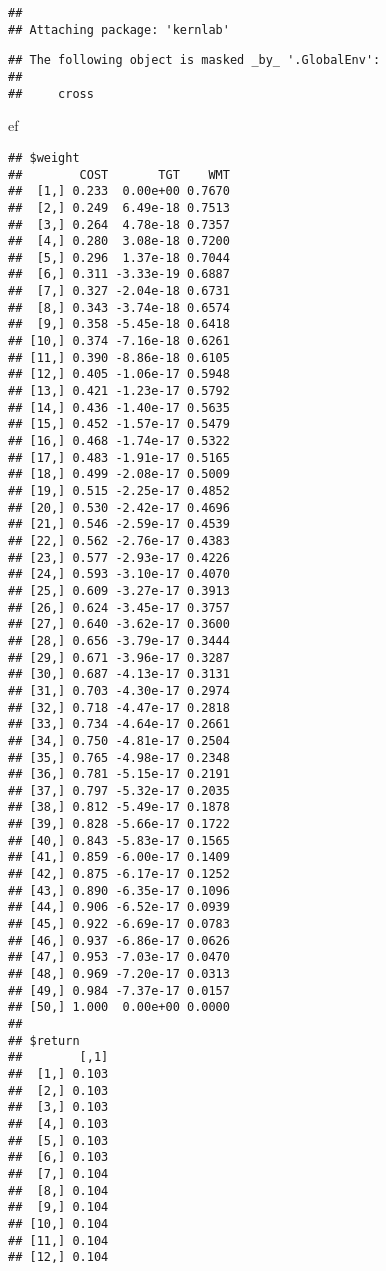 \documentclass[]{article}
\newenvironment{Shaded}{\begin{snugshade}}{\end{snugshade}}
\newcommand{\NormalTok}[1]{#1}
\begin{document}
\begin{verbatim}
## 
## Attaching package: 'kernlab'
\end{verbatim}

\begin{verbatim}
## The following object is masked _by_ '.GlobalEnv':
## 
##     cross
\end{verbatim}

\begin{Shaded}
\begin{Highlighting}[]
\NormalTok{ef}
\end{Highlighting}
\end{Shaded}

\begin{verbatim}
## $weight
##        COST       TGT    WMT
##  [1,] 0.233  0.00e+00 0.7670
##  [2,] 0.249  6.49e-18 0.7513
##  [3,] 0.264  4.78e-18 0.7357
##  [4,] 0.280  3.08e-18 0.7200
##  [5,] 0.296  1.37e-18 0.7044
##  [6,] 0.311 -3.33e-19 0.6887
##  [7,] 0.327 -2.04e-18 0.6731
##  [8,] 0.343 -3.74e-18 0.6574
##  [9,] 0.358 -5.45e-18 0.6418
## [10,] 0.374 -7.16e-18 0.6261
## [11,] 0.390 -8.86e-18 0.6105
## [12,] 0.405 -1.06e-17 0.5948
## [13,] 0.421 -1.23e-17 0.5792
## [14,] 0.436 -1.40e-17 0.5635
## [15,] 0.452 -1.57e-17 0.5479
## [16,] 0.468 -1.74e-17 0.5322
## [17,] 0.483 -1.91e-17 0.5165
## [18,] 0.499 -2.08e-17 0.5009
## [19,] 0.515 -2.25e-17 0.4852
## [20,] 0.530 -2.42e-17 0.4696
## [21,] 0.546 -2.59e-17 0.4539
## [22,] 0.562 -2.76e-17 0.4383
## [23,] 0.577 -2.93e-17 0.4226
## [24,] 0.593 -3.10e-17 0.4070
## [25,] 0.609 -3.27e-17 0.3913
## [26,] 0.624 -3.45e-17 0.3757
## [27,] 0.640 -3.62e-17 0.3600
## [28,] 0.656 -3.79e-17 0.3444
## [29,] 0.671 -3.96e-17 0.3287
## [30,] 0.687 -4.13e-17 0.3131
## [31,] 0.703 -4.30e-17 0.2974
## [32,] 0.718 -4.47e-17 0.2818
## [33,] 0.734 -4.64e-17 0.2661
## [34,] 0.750 -4.81e-17 0.2504
## [35,] 0.765 -4.98e-17 0.2348
## [36,] 0.781 -5.15e-17 0.2191
## [37,] 0.797 -5.32e-17 0.2035
## [38,] 0.812 -5.49e-17 0.1878
## [39,] 0.828 -5.66e-17 0.1722
## [40,] 0.843 -5.83e-17 0.1565
## [41,] 0.859 -6.00e-17 0.1409
## [42,] 0.875 -6.17e-17 0.1252
## [43,] 0.890 -6.35e-17 0.1096
## [44,] 0.906 -6.52e-17 0.0939
## [45,] 0.922 -6.69e-17 0.0783
## [46,] 0.937 -6.86e-17 0.0626
## [47,] 0.953 -7.03e-17 0.0470
## [48,] 0.969 -7.20e-17 0.0313
## [49,] 0.984 -7.37e-17 0.0157
## [50,] 1.000  0.00e+00 0.0000
## 
## $return
##        [,1]
##  [1,] 0.103
##  [2,] 0.103
##  [3,] 0.103
##  [4,] 0.103
##  [5,] 0.103
##  [6,] 0.103
##  [7,] 0.104
##  [8,] 0.104
##  [9,] 0.104
## [10,] 0.104
## [11,] 0.104
## [12,] 0.104

\end{verbatim}
\end{document}
